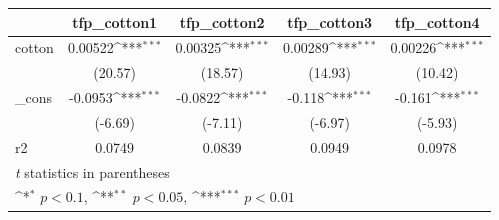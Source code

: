 {
\def\sym#1{\ifmmode^{#1}\else\(^{#1}\)\fi}
\begin{tabular}{l*{4}{c}}
\hline\hline
            &\multicolumn{1}{c}{tfp\_cotton1}&\multicolumn{1}{c}{tfp\_cotton2}&\multicolumn{1}{c}{tfp\_cotton3}&\multicolumn{1}{c}{tfp\_cotton4}\\
\hline
cotton      &     0.00522\sym{***}&     0.00325\sym{***}&     0.00289\sym{***}&     0.00226\sym{***}\\
            &     (20.57)         &     (18.57)         &     (14.93)         &     (10.42)         \\
[1em]
\_cons      &     -0.0953\sym{***}&     -0.0822\sym{***}&      -0.118\sym{***}&      -0.161\sym{***}\\
            &     (-6.69)         &     (-7.11)         &     (-6.97)         &     (-5.93)         \\
\hline
r2          &      0.0749         &      0.0839         &      0.0949         &      0.0978         \\
\hline\hline
\multicolumn{5}{l}{\footnotesize \textit{t} statistics in parentheses}\\
\multicolumn{5}{l}{\footnotesize \sym{*} \(p<0.1\), \sym{**} \(p<0.05\), \sym{***} \(p<0.01\)}\\
\end{tabular}
}
